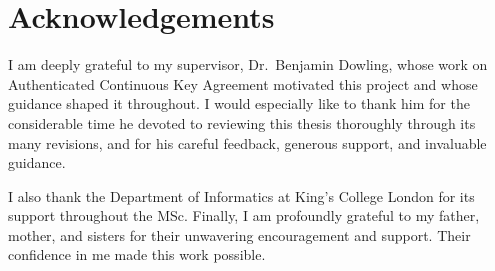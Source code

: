 \documentclass[11pt,a4paper,oneside]{report}
\theoremstyle{definition}
\begin{document}
\chapter*{Acknowledgements}
I am deeply grateful to my supervisor, Dr.\ Benjamin Dowling, whose work on Authenticated Continuous
Key Agreement motivated this project and whose guidance shaped it throughout. I would especially like
to thank him for the considerable time he devoted to reviewing this thesis thoroughly through its many
revisions, and for his careful feedback, generous support, and invaluable guidance.

I also thank the Department of Informatics at King's College London for its support throughout the
MSc. Finally, I am profoundly grateful to my father, mother, and sisters for their unwavering
encouragement and support. Their confidence in me made this work possible.

\tableofcontents
\listoffigures
\listoftables

\end{document}
